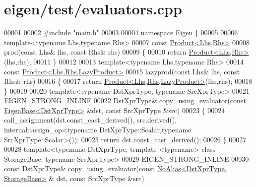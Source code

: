 \hypertarget{eigen_2test_2evaluators_8cpp_source}{}\section{eigen/test/evaluators.cpp}
\label{eigen_2test_2evaluators_8cpp_source}

\begin{DoxyCode}
00001 
00002 \textcolor{preprocessor}{#include "main.h"}
00003 
00004 \textcolor{keyword}{namespace }\hyperlink{namespace_eigen}{Eigen} \{
00005 
00006   \textcolor{keyword}{template}<\textcolor{keyword}{typename} Lhs,\textcolor{keyword}{typename} Rhs>
00007   \textcolor{keyword}{const} \hyperlink{group___core___module}{Product<Lhs,Rhs>}
00008   prod(\textcolor{keyword}{const} Lhs& lhs, \textcolor{keyword}{const} Rhs& rhs)
00009   \{
00010     \textcolor{keywordflow}{return} \hyperlink{group___core___module}{Product<Lhs,Rhs>}(lhs,rhs);
00011   \}
00012 
00013   \textcolor{keyword}{template}<\textcolor{keyword}{typename} Lhs,\textcolor{keyword}{typename} Rhs>
00014   \textcolor{keyword}{const} \hyperlink{group___core___module_class_eigen_1_1_product}{Product<Lhs,Rhs,LazyProduct>}
00015   lazyprod(\textcolor{keyword}{const} Lhs& lhs, \textcolor{keyword}{const} Rhs& rhs)
00016   \{
00017     \textcolor{keywordflow}{return} \hyperlink{group___core___module_class_eigen_1_1_product}{Product<Lhs,Rhs,LazyProduct>}(lhs,rhs);
00018   \}
00019   
00020   \textcolor{keyword}{template}<\textcolor{keyword}{typename} DstXprType, \textcolor{keyword}{typename} SrcXprType>
00021   EIGEN\_STRONG\_INLINE
00022   DstXprType& copy\_using\_evaluator(\textcolor{keyword}{const} \hyperlink{group___core___module_struct_eigen_1_1_eigen_base}{EigenBase<DstXprType>} &dst, \textcolor{keyword}{const} SrcXprType 
      &src)
00023   \{
00024     call\_assignment(dst.const\_cast\_derived(), src.derived(), internal::assign\_op<typename
       DstXprType::Scalar,typename SrcXprType::Scalar>());
00025     \textcolor{keywordflow}{return} dst.const\_cast\_derived();
00026   \}
00027   
00028   \textcolor{keyword}{template}<\textcolor{keyword}{typename} DstXprType, \textcolor{keyword}{template} <\textcolor{keyword}{typename}> \textcolor{keyword}{class }StorageBase, \textcolor{keyword}{typename} SrcXprType>
00029   EIGEN\_STRONG\_INLINE
00030   \textcolor{keyword}{const} DstXprType& copy\_using\_evaluator(\textcolor{keyword}{const} \hyperlink{group___core___module_class_eigen_1_1_no_alias}{NoAlias<DstXprType, StorageBase>}
      & dst, \textcolor{keyword}{const} SrcXprType &src)

\end{DoxyCode}
